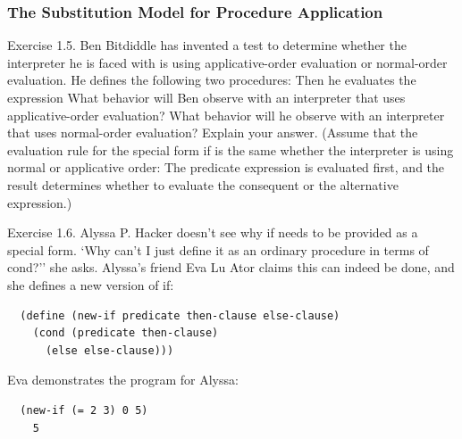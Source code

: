             \subsubsection{The Substitution Model for Procedure Application}
Exercise 1.5. Ben Bitdiddle has invented a test to determine whether the interpreter he is faced with is using applicative-order evaluation or normal-order evaluation. He defines the following two procedures:
\newline
{}
\newline
{}
\newline
{}
\newline
{}
\newline
{}
\newline
Then he evaluates the expression
\newline
{}
\newline
What behavior will Ben observe with an interpreter that uses applicative-order evaluation? What behavior will he observe with an interpreter that uses normal-order evaluation? Explain your answer.  (Assume that the evaluation rule for the special form if is the same whether the interpreter is using normal or applicative order: The predicate expression is evaluated first, and the result determines whether to evaluate the consequent or the alternative expression.)
\newline

Exercise 1.6.  Alyssa P. Hacker doesn't see why if needs to be provided as a special form. `Why can't I just define it as an ordinary procedure in terms of cond?'' she asks. Alyssa's friend Eva Lu Ator claims this can indeed be done, and she defines a new version of if:
\newline

\begin{verbatim}
  (define (new-if predicate then-clause else-clause)
    (cond (predicate then-clause)
      (else else-clause)))
\end{verbatim}
\newline

Eva demonstrates the program for Alyssa:
\newline

\begin{verbatim}
  (new-if (= 2 3) 0 5)
    5
\end{verbatim}
\newline

